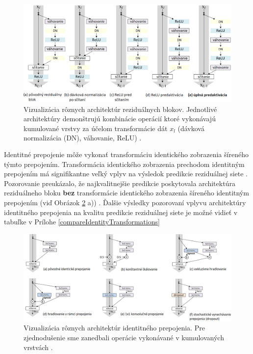 \begin{figure}
\centerline{\includegraphics[width=1\textwidth]{images/architectures_of_residual_blocks}}
\caption[Vizualizácia rôznych architektúr reziduálnych blokov]{Vizualizácia rôznych architektúr reziduálnych blokov. Jednotlivé architektúry demonštrujú kombinácie operácií ktoré vykonávajú kumulované vrstvy za účelom transformácie dát $x_l$ (dávková normalizácia (DN), váhovanie, ReLU) \cite{He2016}.}
\label{fig:architectures_of_residual_blocks}
\end{figure}

Identitné prepojenie môže vykonať transformáciu identického zobrazenia šíreného týmto prepojením. Transformácia identického zobrazenia prechodom identitným prepojením má signifikantne veľký vplyv na výsledok predikcie reziduálnej siete \cite{He2016}. Pozorovanie preukázalo, že najkvalitnejšie predikcie poskytovala architektúra reziduálneho bloku \textbf{bez} transformácie identického zobrazenia šíreného identitným prepojením (viď Obrázok \ref{fig:achitectures_of_identity_shortcut} a)) \cite{He2016}. Ďalšie výsledky pozorovaní vplyvu architektúry identitného prepojenia na kvalitu predikcie reziduálnej siete je možné vidieť v tabuľke v Prílohe \ref{compareIdentityTransformations}

\begin{figure}
\centerline{\includegraphics[width=1\textwidth]{images/achitectures_of_identity_shortcut}}
\caption[Vizualizácia rôznych architektúr identitneho prepojenia]{Vizualizácia rôznych architektúr identitného prepojenia. Pre zjednodušenie sme zanedbali operácie vykonávané v kumulovaných vrstvách \cite{He2016}.}
\label{fig:achitectures_of_identity_shortcut}
\end{figure}



